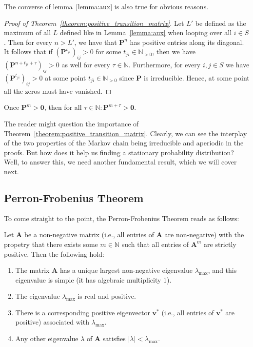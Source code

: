 \documentclass[../../main.tex]{subfiles}
\begin{document}
\begin{remark}
    \label{remark:converse_lemma_aux}
    The converse of lemma~\ref{lemma:aux} is also true for obvious reasons.
\end{remark}

\begin{proof}[Proof of Theorem~\ref{theorem:positive_transition_matrix}]
    Let $L'$ be defined as the maximum of all $L$ defined like in Lemma~\ref{lemma:aux} when looping over all $i \in S$. Then for every $n > L'$, we have that $\bm{P}^n$ has positive entries along its diagonal. It follows that if $(\bm{P}^{t_{ji}})_{ij} > 0$ for some $t_{ji} \in \mathbb{N}_{>0}$, then we have $(\bm{P}^{n + t_{ji} + \tau})_{ij} > 0$ as well for every $\tau \in \mathbb{N}$. Furthermore, for every $i,j \in S$ we have $(\bm{P}^{t_{ji}})_{ij} > 0$ at some point $t_{ji} \in \mathbb{N}_{>0}$ since $\bm{P}$ is irreducible. Hence, at some point all the zeros must have vanished.
\end{proof}

\begin{corollary}
    Once $\bm{P}^m > \bm{0}$, then for all $\tau \in \mathbb{N}: \bm{P}^{m + \tau} > \bm{0}$. 
\end{corollary}

The reader might question the importance of Theorem~\ref{theorem:positive_transition_matrix}. Clearly, we can see the interplay of the two properties of the Markov chain being irreducible and aperiodic in the proofs. But how does it help us finding a stationary probability distribution? Well, to answer this, we need another fundamental result, which we will cover next.


\subsection{Perron-Frobenius Theorem}
To come straight to the point, the Perron-Frobenius Theorem reads as follows:

\begin{theorem}
    \label{theorem:perron_frobenius}
    Let \( \bm{A} \) be a non-negative matrix (i.e., all entries of \( \bm{A} \) are non-negative) with the propetry that there exists some \( m \in \mathbb{N} \) such that all entries of \( \bm{A}^m \) are strictly positive. Then the following hold:

    \begin{enumerate}
        \item The matrix \( \bm{A} \) has a unique largest non-negative eigenvalue \( \lambda_{\max} \), and this eigenvalue is simple (it has algebraic multiplicity 1).
        \item The eigenvalue \( \lambda_{\max} \) is real and positive.
        \item There is a corresponding positive eigenvector \( \bm{v}^* \) (i.e., all entries of \( \bm{v}^* \) are positive) associated with \( \lambda_{\max} \).
        \item Any other eigenvalue \( \lambda \) of \( \bm{A} \) satisfies \( |\lambda| < \lambda_{\max} \).
    \end{enumerate}
\end{theorem}
\end{document}
